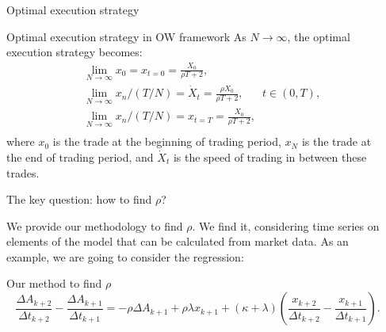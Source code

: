 \documentclass[]{beamer}
\begin{document}
\begin{frame}[t]
\begin{columns}[t]
\begin{column}{\onecolwid}
    \begin{block}{Optimal execution strategy }
    
    
    \begin{alertblock}{Optimal execution strategy in OW framework}
        As $N \rightarrow \infty$, the optimal execution strategy becomes:
        \begin{align*}
            & \lim _{N \rightarrow \infty} x_0 = x_{t = 0} = \frac{X_0}{\rho T + 2}, \\
            & \lim _{N \rightarrow \infty} x_n / (T/N) = \dot X _t = \frac{\rho X_0}{\rho T + 2}, \;\;\;\;\;\; t \in (0, T), \\
            & \lim _{N \rightarrow \infty} x_n / (T/N) = x_{t=T}=  \frac{X_0}{\rho T + 2},  \\
        \end{align*}
        where $x_0$ is the trade at the beginning of trading period, $x_N$ is the trade at the end of trading
        period, and $\dot X _t$ is the speed of trading in between these trades.
    \end{alertblock}
    \end{block}

    \begin{block}{The key question: how to find $\rho$?}
        
        We provide our methodology to find $\rho$. We find it, considering time series on elements of the model 
        that can be calculated from market data. As an example, we are going to consider the regression:
        \begin{alertblock}{Our method to find $\rho$}
            \begin{equation*}
                \frac{\Delta A_{k+2}}{\Delta t_{k+2}} - \frac{\Delta A_{k+1}}{\Delta t_{k+1}} 
        = - \rho \Delta A_{k+1} + \rho \lambda x_{k+1} + (\kappa + \lambda) (\frac{x_{k+2}}{\Delta t_{k+2}} - \frac{x_{k+1}}{\Delta t_{k+1}}).
            \end{equation*}
        \end{alertblock}
    \end{block}

   
    
    \end{column}
    
    
    \begin{column}{\sepwid}\end{column} %
    

\end{columns}
\end{frame}
\end{document}
